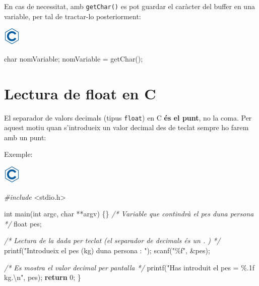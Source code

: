\documentclass[
]{book}
\newenvironment{Shaded}{\begin{snugshade}}{\end{snugshade}}
\newcommand{\CommentTok}[1]{\textcolor[rgb]{0.56,0.35,0.01}{\textit{#1}}}
\newcommand{\ControlFlowTok}[1]{\textcolor[rgb]{0.13,0.29,0.53}{\textbf{#1}}}
\newcommand{\DataTypeTok}[1]{\textcolor[rgb]{0.13,0.29,0.53}{#1}}
\newcommand{\DecValTok}[1]{\textcolor[rgb]{0.00,0.00,0.81}{#1}}
\newcommand{\ImportTok}[1]{#1}
\newcommand{\NormalTok}[1]{#1}
\newcommand{\PreprocessorTok}[1]{\textcolor[rgb]{0.56,0.35,0.01}{\textit{#1}}}
\newcommand{\SpecialCharTok}[1]{\textcolor[rgb]{0.00,0.00,0.00}{#1}}
\newcommand{\StringTok}[1]{\textcolor[rgb]{0.31,0.60,0.02}{#1}}
\begin{document}
En cas de necessitat, amb \texttt{getChar()} es pot guardar el caràcter del buffer en una variable, per tal de tractar-lo posteriorment:

\includegraphics{./img/c.png}

\begin{Shaded}
\begin{Highlighting}[]
\DataTypeTok{char}\NormalTok{ nomVariable;}
\NormalTok{nomVariable = getChar();}
\end{Highlighting}
\end{Shaded}

\hypertarget{lectura-de-float-en-c}{%
\section{Lectura de float en C}\label{lectura-de-float-en-c}}

El separador de valors decimals (tipus \texttt{float}) en C \textbf{és el punt}, no la coma. Per aquest motiu quan s'introdueix un valor decimal des de teclat sempre ho farem amb un punt:

Exemple:

\includegraphics{./img/c.png}

\begin{Shaded}
\begin{Highlighting}[]
\PreprocessorTok{\#include }\ImportTok{\textless{}stdio.h\textgreater{}}

\DataTypeTok{int}\NormalTok{ main(}\DataTypeTok{int}\NormalTok{ argc, }\DataTypeTok{char}\NormalTok{ **argv) \{\}}
    \CommentTok{/* Variable que contindrà el pes d\textquotesingle{}una persona */}
    \DataTypeTok{float}\NormalTok{ pes;}

    \CommentTok{/* Lectura de la dada per teclat (el separador de decimals és un . ) */}
\NormalTok{    printf(}\StringTok{"Introdueix el pes (kg) d\textquotesingle{}una persona : "}\NormalTok{);}
\NormalTok{    scanf(}\StringTok{"\%f"}\NormalTok{, \&pes);}

    \CommentTok{/* Es mostra el valor decimal per pantalla */}
\NormalTok{    printf(}\StringTok{"Has introduit el pes = \%.1f kg.}\SpecialCharTok{\textbackslash{}n}\StringTok{"}\NormalTok{, pes);}
    \ControlFlowTok{return} \DecValTok{0}\NormalTok{;}
\NormalTok{\}}
\end{Highlighting}
\end{Shaded}
\end{document}
